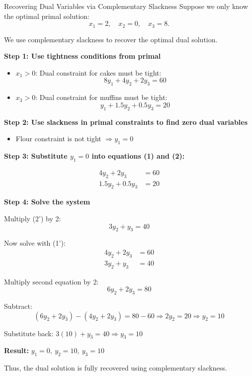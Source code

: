 \begin{example}{Recovering Dual Variables via Complementary Slackness}{}
Suppose we only know the optimal primal solution:
\[
x_1 = 2,\quad x_2 = 0,\quad x_3 = 8.
\]

We use complementary slackness to recover the optimal dual solution.

\textbf{Step 1: Use tightness conditions from primal}

\begin{itemize}
\item \(x_1 > 0\): Dual constraint for cakes must be tight:
\[
8y_1 + 4y_2 + 2y_3 = 60 \tag{1}
\]
\item \(x_3 > 0\): Dual constraint for muffins must be tight:
\[
y_1 + 1.5y_2 + 0.5y_3 = 20 \tag{2}
\]
\end{itemize}

\textbf{Step 2: Use slackness in primal constraints to find zero dual variables}

\begin{itemize}
\item Flour constraint is not tight \( \Rightarrow y_1 = 0 \)
\end{itemize}

\textbf{Step 3: Substitute \(y_1 = 0\) into equations (1) and (2):}

\[
\begin{aligned}
4y_2 + 2y_3 &= 60  \\
1.5y_2 + 0.5y_3 &= 20 
\end{aligned}
\]

\textbf{Step 4: Solve the system}

Multiply (2') by 2:
\[
3y_2 + y_3 = 40
\]

Now solve with (1'):
\[
\begin{aligned}
4y_2 + 2y_3 &= 60 \\
3y_2 + y_3 &= 40
\end{aligned}
\]

Multiply second equation by 2:
\[
6y_2 + 2y_3 = 80
\]

Subtract:
\[
(6y_2 + 2y_3) - (4y_2 + 2y_3) = 80 - 60 \Rightarrow 2y_2 = 20 \Rightarrow y_2 = 10
\]

Substitute back: \( 3(10) + y_3 = 40 \Rightarrow y_3 = 10 \)

\textbf{Result: } \( y_1 = 0,\ y_2 = 10,\ y_3 = 10 \)

Thus, the dual solution is fully recovered using complementary slackness.
\end{example}

